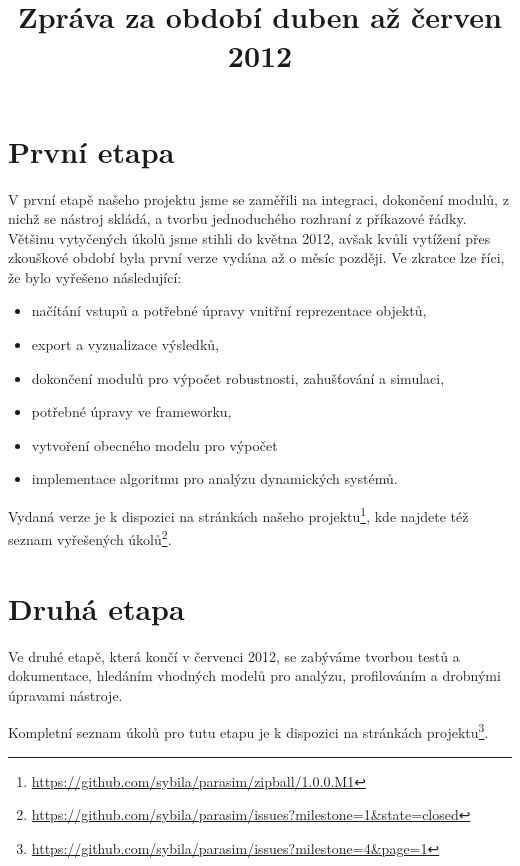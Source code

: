 \documentclass{parasim}
\title{Zpráva za období duben až červen 2012}
\begin{document}
\section{První etapa}

V první etapě našeho projektu jsme se zaměřili na integraci, dokončení modulů,
z nichž se nástroj skládá, a tvorbu jednoduchého rozhraní
z příkazové řádky. Většinu vytyčených úkolů jsme stihli do května 2012, avšak
kvůli vytížení přes zkouškové období byla první verze vydána až o měsíc později.
Ve zkratce lze říci, že bylo vyřešeno následující:

\begin{itemize}
    \item   načítání vstupů a potřebné úpravy vnitřní reprezentace objektů,
    \item   export a vyzualizace výsledků,
    \item   dokončení modulů pro výpočet robustnosti, zahušťování a simulaci,
    \item   potřebné úpravy ve frameworku,
    \item   vytvoření obecného modelu pro výpočet
	\item	implementace algoritmu pro analýzu dynamických systémů.
\end{itemize}


Vydaná verze je k dispozici na stránkách našeho projektu\footnote{\url{https://github.com/sybila/parasim/zipball/1.0.0.M1}},
kde najdete též seznam vyřešených úkolů\footnote{\url{https://github.com/sybila/parasim/issues?milestone=1&state=closed}}.

\section{Druhá etapa}

Ve druhé etapě, která končí v červenci 2012, se zabýváme tvorbou testů a dokumentace,
hledáním vhodných modelů pro analýzu, profilováním a drobnými úpravami nástroje.

Kompletní seznam úkolů pro tutu etapu je k dispozici na stránkách projektu\footnote{\url{https://github.com/sybila/parasim/issues?milestone=4&page=1}}.
\end{document}
